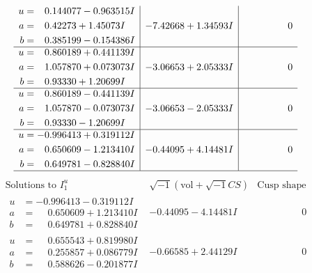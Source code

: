 \documentclass[1p]{elsarticle_modified}
\theoremstyle{definition}
\newcommand{\I}{\sqrt{-1}}
\begin{document}
$$\begin{array}{c|c|c}
\begin{aligned}
u &= \phantom{-}0.144077 - 0.963515 I \\
a &= \phantom{-}0.42273 + 1.45073 I \\
b &= \phantom{-}0.385199 - 0.154386 I\end{aligned}
 & -7.42668 + 1.34593 I & \phantom{-0.000000 } 0 \\ \hline\begin{aligned}
u &= \phantom{-}0.860189 + 0.441139 I \\
a &= \phantom{-}1.057870 + 0.073073 I \\
b &= \phantom{-}0.93330 + 1.20699 I\end{aligned}
 & -3.06653 + 2.05333 I & \phantom{-0.000000 } 0 \\ \hline\begin{aligned}
u &= \phantom{-}0.860189 - 0.441139 I \\
a &= \phantom{-}1.057870 - 0.073073 I \\
b &= \phantom{-}0.93330 - 1.20699 I\end{aligned}
 & -3.06653 - 2.05333 I & \phantom{-0.000000 } 0 \\ \hline\begin{aligned}
u &= -0.996413 + 0.319112 I \\
a &= \phantom{-}0.650609 - 1.213410 I \\
b &= \phantom{-}0.649781 - 0.828840 I\end{aligned}
 & -0.44095 + 4.14481 I & \phantom{-0.000000 } 0\\
 \hline 
 \end{array}$$\newpage$$\begin{array}{c|c|c}  
\text{Solutions to }I^u_{1}& \I (\text{vol} + \sqrt{-1}CS) & \text{Cusp shape}\\
 \hline 
\begin{aligned}
u &= -0.996413 - 0.319112 I \\
a &= \phantom{-}0.650609 + 1.213410 I \\
b &= \phantom{-}0.649781 + 0.828840 I\end{aligned}
 & -0.44095 - 4.14481 I & \phantom{-0.000000 } 0 \\ \hline\begin{aligned}
u &= \phantom{-}0.655543 + 0.819980 I \\
a &= \phantom{-}0.255857 + 0.086779 I \\
b &= \phantom{-}0.588626 - 0.201877 I\end{aligned}
 & -0.66585 + 2.44129 I & \phantom{-0.000000 } 0 \\ \hline\begin{aligned}

\end{aligned}
\end{array}$$
\end{document}

